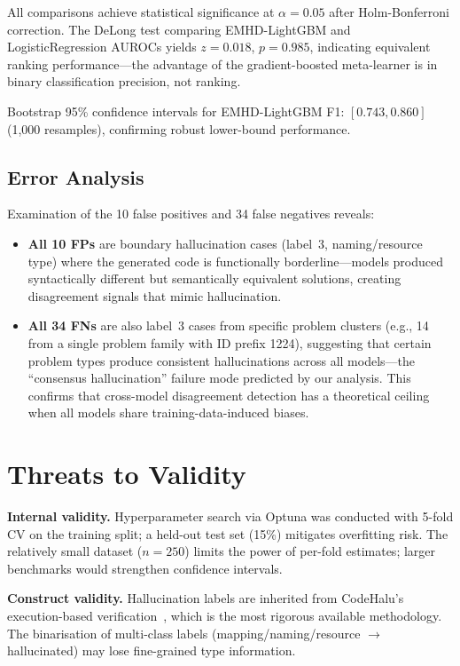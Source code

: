 \documentclass[11pt,a4paper]{article}
\begin{document}
All comparisons achieve statistical significance at $\alpha = 0.05$ after Holm-Bonferroni correction. The DeLong test comparing EMHD-LightGBM and LogisticRegression AUROCs yields $z = 0.018$, $p = 0.985$, indicating equivalent ranking performance---the advantage of the gradient-boosted meta-learner is in binary classification precision, not ranking.

Bootstrap 95\% confidence intervals for EMHD-LightGBM F1: $[0.743, 0.860]$ (1,000 resamples), confirming robust lower-bound performance.

\subsection{Error Analysis}

Examination of the 10 false positives and 34 false negatives reveals:
\begin{itemize}
\item \textbf{All 10 FPs} are boundary hallucination cases (label~3, naming/resource type) where the generated code is functionally borderline---models produced syntactically different but semantically equivalent solutions, creating disagreement signals that mimic hallucination.
\item \textbf{All 34 FNs} are also label~3 cases from specific problem clusters (e.g., 14 from a single problem family with ID prefix 1224), suggesting that certain problem types produce consistent hallucinations across all models---the ``consensus hallucination'' failure mode predicted by our analysis. This confirms that cross-model disagreement detection has a theoretical ceiling when all models share training-data-induced biases.
\end{itemize}


\section{Threats to Validity}
\label{sec:threats}

\textbf{Internal validity.} Hyperparameter search via Optuna was conducted with 5-fold CV on the training split; a held-out test set (15\%) mitigates overfitting risk. The relatively small dataset ($n=250$) limits the power of per-fold estimates; larger benchmarks would strengthen confidence intervals.

\textbf{Construct validity.} Hallucination labels are inherited from CodeHalu's execution-based verification~\cite{tian2025codehalu}, which is the most rigorous available methodology. The binarisation of multi-class labels (mapping/naming/resource $\to$ hallucinated) may lose fine-grained type information.
\end{document}
